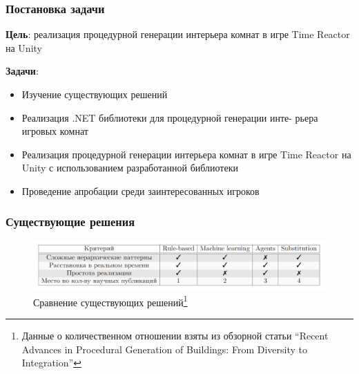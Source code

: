 \documentclass{beamer}
\begin{document}
\begin{frame}
  \frametitle{Постановка задачи}
  \textbf{Цель}: реализация процедурной генерации интерьера комнат в игре Time Reactor на Unity %

  \textbf{Задачи}:
  \begin{itemize}
    \item Изучение существующих решений
    \item Реализация .NET библиотеки для процедурной генерации инте-
рьера игровых комнат
    \item Реализация процедурной генерации интерьера комнат в игре Time
Reactor на Unity с использованием разработанной библиотеки
    \item Проведение апробации среди заинтересованных игроков
  \end{itemize}
\end{frame}
            
\begin{frame}  
  \frametitle{Существующие решения}
  \vspace*{\fill}
  \begin{center}
        \begin{figure}
            \centering
            \includegraphics[width=1.0\textwidth]{pictures/comparison_table.png}
            \caption{Сравнение существующих решений\footnote{Данные о количественном отношении взяты из обзорной статьи \enquote{Recent Advances in Procedural Generation of Buildings: From Diversity to Integration}}}
        \end{figure}
  \end{center}
  \vspace*{\fill}
\end{frame}
            
\end{document}
